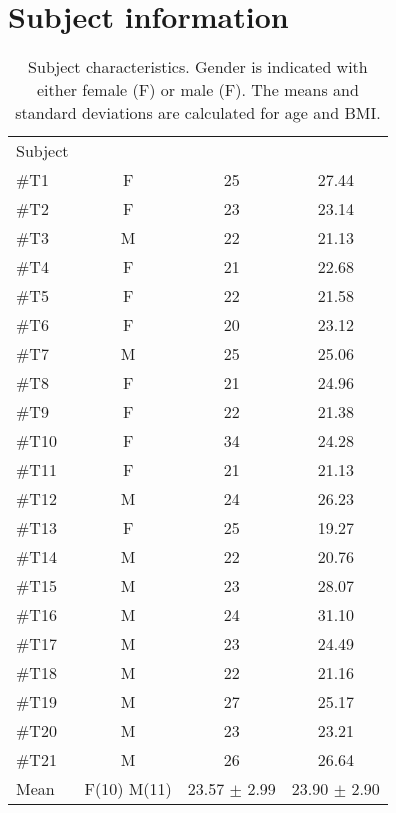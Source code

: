 \chapter{Subject information} \label{SubjectINFO}

\begin{longtable}{l|c|c|c}
	\caption{Subject characteristics. Gender is indicated with either female (F) or male (F). The means and standard deviations are calculated for age and BMI.}
	\label{tab:subjectsA} \\
\cellcolor[HTML]{C0C0C0} {Subject} & 
\cellcolor[HTML]{C0C0C0}{Age} & \cellcolor[HTML]{C0C0C0}{Gender}  & \cellcolor[HTML]{C0C0C0}{BMI}  	\\  \rule{0pt}{3ex} 
\#T1 & F  & 25  & 27.44  \\ \hline \hline \rule{0pt}{3ex} 
\#T2 & F & 23 & 23.14  \\ \hline \hline \rule{0pt}{3ex} 
\#T3 & M & 22 & 21.13  \\ \hline \hline \rule{0pt}{3ex} 
\#T4 & F & 21  & 22.68  \\ \hline \hline \rule{0pt}{3ex} 
\#T5 & F & 22 & 21.58   \\ \hline \hline \rule{0pt}{3ex} 
\#T6 & F & 20 & 23.12 \\ \hline \hline \rule{0pt}{3ex} 
\#T7 & M & 25  & 25.06  \\ \hline \hline \rule{0pt}{3ex} 
	\#T8 & F & 21 & 24.96  \\ \hline \hline \rule{0pt}{3ex} 
	\#T9 & F & 22 & 21.38   \\ \hline \hline \rule{0pt}{3ex} 
	\#T10 & F & 34 & 24.28  \\ \hline \hline \rule{0pt}{3ex} 
	\#T11 & F & 21 & 21.13 \\ \hline \hline \rule{0pt}{3ex} 
\#T12 & M  & 24  & 26.23\\ \hline \hline \rule{0pt}{3ex} 
\#T13 &  F & 25 & 19.27 \\ \hline \hline \rule{0pt}{3ex} 
\#T14 & M  & 22 & 20.76  \\ \hline \hline \rule{0pt}{3ex} 
\#T15 & M & 23 & 28.07  \\ \hline \hline \rule{0pt}{3ex} 
\#T16 & M & 24 & 31.10 \\ \hline \hline \rule{0pt}{3ex} 
\#T17 & M & 23 & 24.49  \\ \hline \hline \rule{0pt}{3ex} 
	\#T18 & M & 22 & 21.16 \\ \hline \hline \rule{0pt}{3ex} 
	\#T19 & M & 27 & 25.17 \\ \hline \hline \rule{0pt}{3ex} 
	\#T20 & M & 23  & 23.21  \\ \hline \hline \rule{0pt}{3ex}
		\#T21 & M & 26 & 26.64   \\ \hline \hline \rule{0pt}{3ex} 
	Mean & F(10) M(11) & 23.57 $\pm$ 2.99  & 23.90 $\pm$ 2.90
	\\ \hline 
\end{longtable}
\vspace{-.5cm}



